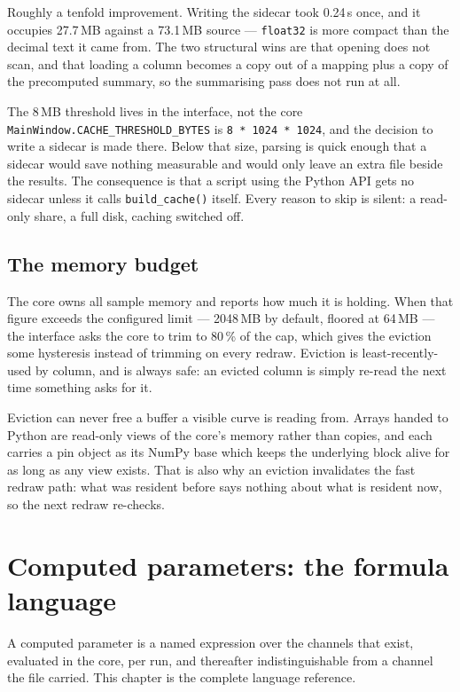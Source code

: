 \documentclass[11pt,a4paper,oneside]{report}
\newcommand{\code}[1]{\texttt{#1}}
\begin{document}
Roughly a tenfold improvement. Writing the sidecar took 0.24\,s once, and it
occupies 27.7\,MB against a 73.1\,MB source --- \code{float32} is more compact
than the decimal text it came from. The two structural wins are that opening does
not scan, and that loading a column becomes a copy out of a mapping plus a copy
of the precomputed summary, so the summarising pass does not run at all.

\begin{aoenote}{The 8\,MB threshold lives in the interface, not the core}
\code{MainWindow.CACHE\_THRESHOLD\_BYTES} is \code{8 * 1024 * 1024}, and the
decision to write a sidecar is made there. Below that size, parsing is quick
enough that a sidecar would save nothing measurable and would only leave an extra
file beside the results. The consequence is that a script using the Python API
gets no sidecar unless it calls \code{build\_cache()} itself. Every reason to
skip is silent: a read-only share, a full disk, caching switched off.
\end{aoenote}

\section{The memory budget}

The core owns all sample memory and reports how much it is holding. When that
figure exceeds the configured limit --- 2048\,MB by default, floored at 64\,MB
--- the interface asks the core to trim to 80\,\% of the cap, which gives the
eviction some hysteresis instead of trimming on every redraw. Eviction is
least-recently-used by column, and is always safe: an evicted column is simply
re-read the next time something asks for it.

Eviction can never free a buffer a visible curve is reading from. Arrays handed
to Python are read-only views of the core's memory rather than copies, and each
carries a pin object as its NumPy base which keeps the underlying block alive for
as long as any view exists. That is also why an eviction invalidates the fast
redraw path: what was resident before says nothing about what is resident now, so
the next redraw re-checks.

\chapter{Computed parameters: the formula language}
\label{ch:formula}

A computed parameter is a named expression over the channels that exist,
evaluated in the core, per run, and thereafter indistinguishable from a channel
the file carried. This chapter is the complete language reference.
\end{document}
